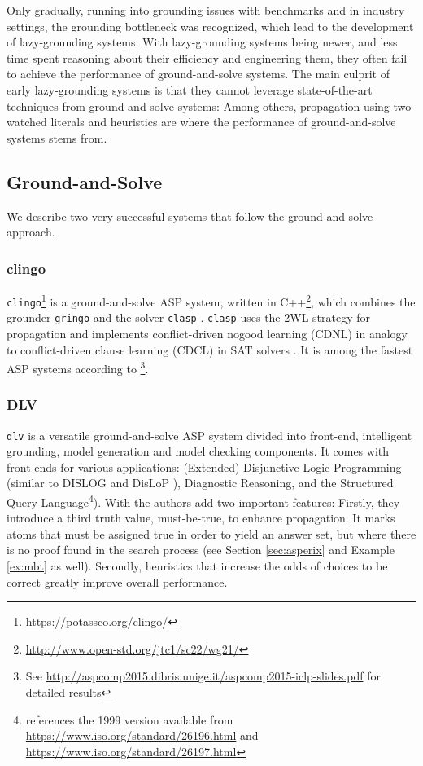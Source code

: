 \documentclass[final]{vutinfth} %
\newcommand{\mbt}{must-be-true\xspace}
\newcommand{\clasp}{\texttt{clasp}\xspace}
\newcommand{\dlv}{\texttt{dlv}\xspace}
\begin{document}
Only gradually, running into grounding issues with benchmarks and in industry settings, the grounding bottleneck was recognized, which lead to the development of lazy-grounding systems. With lazy-grounding systems being newer, and less time spent reasoning about their efficiency and engineering them, they often fail to achieve the performance of ground-and-solve systems. The main culprit of early lazy-grounding systems is that they cannot leverage state-of-the-art techniques from ground-and-solve systems: Among others, propagation using two-watched literals and heuristics are where the performance of ground-and-solve systems stems from.

\subsection{Ground-and-Solve}

We describe two very successful systems that follow the ground-and-solve approach.

\subsubsection{clingo}

\texttt{clingo}\footnote{\url{https://potassco.org/clingo/}} is a ground-and-solve ASP system, written in C++\footnote{\url{http://www.open-std.org/jtc1/sc22/wg21/}}, which combines the grounder \texttt{gringo} and the solver \texttt{clasp} \cite{clasp-first}. \clasp uses the 2WL strategy for propagation \cite[Sec.~5.3]{clasp} and implements conflict-driven nogood learning (CDNL) \cite[Sec.~4.1]{clasp} in analogy to conflict-driven clause learning (CDCL) in SAT solvers \cite{grasp,cdl-sat}. It is among the fastest ASP systems according to \cite{aspcomp2015}\footnote{See \url{http://aspcomp2015.dibris.unige.it/aspcomp2015-iclp-slides.pdf} for detailed results}.

\subsubsection{DLV}
\label{sec:dlv}

\dlv \cite{dlv} is a versatile ground-and-solve ASP system divided into front-end, intelligent grounding, model generation and model checking components. It comes with front-ends for various applications: (Extended) Disjunctive Logic Programming \cite{dlp} (similar to DISLOG \cite{dislog} and DisLoP \cite{dislop}), Diagnostic Reasoning, and the Structured Query Language\footnote{\cite{dlv} references the 1999 version available from \url{https://www.iso.org/standard/26196.html} and \url{https://www.iso.org/standard/26197.html}}). With \cite{dlv-mbt} the authors add two important features: Firstly, they introduce a third truth value, \mbt, to enhance propagation. It marks atoms that must be assigned true in order to yield an answer set, but where there is no proof found in the search process (see Section \ref{sec:asperix} and Example \ref{ex:mbt} as well). Secondly, heuristics that increase the odds of choices to be correct greatly improve overall performance.
\end{document}
